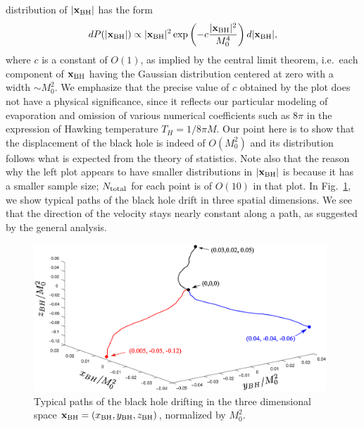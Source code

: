 \documentclass[12pt]{article}
\begin{document}
distribution of $|{\bf x}_{\rm BH}|$ has the form
%
\begin{equation}
  dP(|{\bf x}_{\rm BH}|)
  \propto |{\bf x}_{\rm BH}|^2 
    \exp\left( -c \frac{|{\bf x}_{\rm BH}|^2}{M_0^4} \right) 
    d|{\bf x}_{\rm BH}|,
\label{eq:x-distr}
\end{equation}
%
where $c$ is a constant of $O(1)$, as implied by the central limit theorem, 
i.e.\ each component of ${\bf x}_{\rm BH}$ having the Gaussian distribution 
centered at zero with a width $\sim M_0^2$.  We emphasize that the precise 
value of $c$ obtained by the plot does not have a physical significance, 
since it reflects our particular modeling of evaporation and omission 
of various numerical coefficients such as $8\pi$ in the expression of 
Hawking temperature $T_H = 1/8\pi M$.  Our point here is to show that 
the displacement of the black hole is indeed of $O(M_0^2)$ and its 
distribution follows what is expected from the theory of statistics. 
Note also that the reason why the left plot appears to have smaller 
distributions in $|{\bf x}_{\rm BH}|$ is because it has a smaller sample 
size; $N_{\rm total}$ for each point is of $O(10)$ in that plot.  In 
Fig.~\ref{fig:drift-3D}, we show typical paths of the black hole drift 
in three spatial dimensions.  We see that the direction of the velocity 
stays nearly constant along a path, as suggested by the general analysis.
%
\begin{figure}[t]
\begin{center}
  \includegraphics[width=11cm]{figure/walk.eps}
\caption{Typical paths of the black hole drifting in the three dimensional 
 space ${\bf x}_{\rm BH} = (x_{\rm BH}, y_{\rm BH}, z_{\rm BH})$, normalized 
 by $M_0^2$.}
\label{fig:drift-3D}
\end{center}
\end{figure}
%
\end{document}
